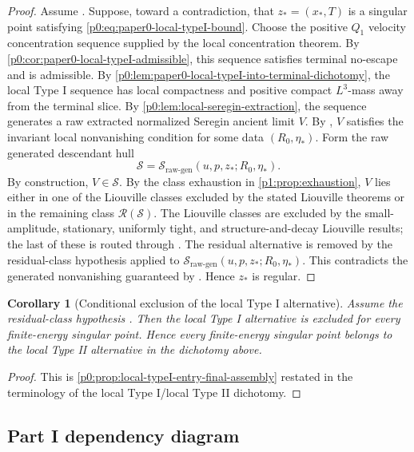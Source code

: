 \documentclass[11pt]{amsart}
\theoremstyle{plain}
\newtheorem{corollary}[corollary]{Corollary}
\theoremstyle{definition}
\theoremstyle{remark}
\numberwithin{equation}{section}
\newcommand{\calS}{\mathcal S}
\newcommand{\calR}{\mathcal R}
\begin{document}
\begin{proof}
Assume .
Suppose, toward a contradiction, that \(z_*=(x_*,T)\) is a singular point
satisfying \eqref{p0:eq:paper0-local-typeI-bound}.
Choose the positive \(Q_1\) velocity concentration sequence supplied by the
local concentration theorem.  By
\cref{p0:cor:paper0-local-typeI-admissible}, this sequence satisfies
terminal no-escape and is admissible.
By \cref{p0:lem:paper0-local-typeI-into-terminal-dichotomy}, the local Type I
sequence has local compactness and positive compact \(L^3\)-mass away from the
terminal slice.
By \cref{p0:lem:local-seregin-extraction}, the sequence generates a raw
extracted normalized Seregin ancient limit \(V\).  By
, \(V\) satisfies the invariant
local nonvanishing condition for some data \((R_0,\eta_*)\).  Form the raw
generated descendant hull
\[
   \calS=\calS_{\mathrm{raw\text{-}gen}}(u,p,z_*;R_0,\eta_*).
\]
By construction, \(V\in\calS\).
By the class exhaustion in
\cref{p1:prop:exhaustion}, \(V\) lies either in one of the Liouville
classes excluded by the stated Liouville theorems or in the remaining class
\(\calR(\calS)\).  The Liouville classes are excluded by the small-amplitude,
stationary, uniformly tight, and structure-and-decay Liouville results; the
last of these is routed through .  The
residual alternative is removed by the residual-class
hypothesis applied to
\(\calS_{\mathrm{raw\text{-}gen}}(u,p,z_*;R_0,\eta_*)\).
This contradicts the generated nonvanishing guaranteed by
.  Hence \(z_*\) is regular.
\end{proof}

\begin{corollary}[Conditional exclusion of the local Type I alternative]
\label{p0:cor:paper0-local-typeII-after-local-typeI-reduction}
Assume the residual-class hypothesis .  Then the
local Type I alternative is excluded for every finite-energy singular point.
Hence every finite-energy singular point belongs to the local Type II
alternative in the dichotomy above.
\end{corollary}

\begin{proof}
This is \cref{p0:prop:local-typeI-entry-final-assembly} restated in the terminology
of the local Type I/local Type II dichotomy.
\end{proof}


\subsection*{Part I dependency diagram}
\end{document}
